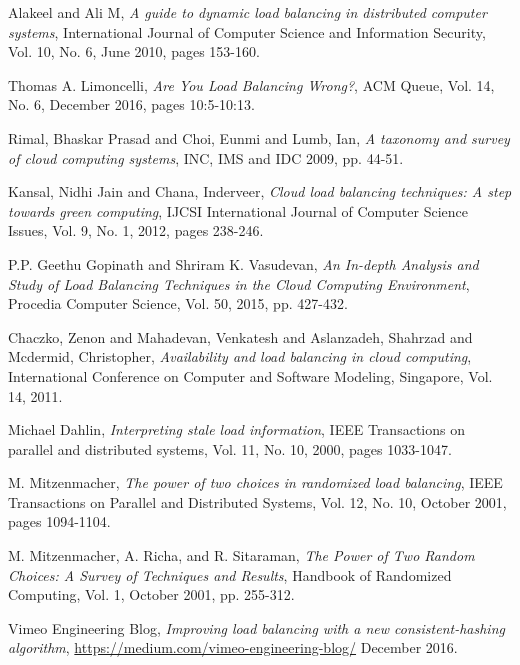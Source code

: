 \begin{thebibliography}{1}

Alakeel and Ali M, \emph{A guide to dynamic load balancing in distributed
  computer systems}, International Journal of Computer Science and Information
  Security, Vol. 10, No. 6, June 2010, pages 153-160.

  Thomas A. Limoncelli, \emph{Are You Load Balancing Wrong?},
  ACM Queue,
  Vol. 14, No. 6, December 2016, pages 10:5-10:13.

  Rimal, Bhaskar Prasad and Choi, Eunmi and Lumb, Ian,
  \emph{A taxonomy and survey of cloud computing systems},
  INC, IMS and IDC
  2009, pp. 44-51.

  Kansal, Nidhi Jain and Chana, Inderveer,
  \emph{Cloud load balancing techniques: A step towards green computing},
  IJCSI International Journal of Computer Science Issues,
  Vol. 9, No. 1, 2012, pages 238-246.

  P.P. Geethu Gopinath and Shriram K. Vasudevan, \emph{An In-depth Analysis and Study of Load Balancing Techniques in the Cloud Computing Environment},
  Procedia Computer Science,
  Vol. 50, 2015, pp. 427-432.

  Chaczko, Zenon and Mahadevan, Venkatesh and Aslanzadeh, Shahrzad and Mcdermid,
  Christopher,
  \emph{Availability and load balancing in cloud computing},
  International Conference on Computer and Software Modeling, Singapore,
  Vol. 14, 2011.

Michael Dahlin, \emph{Interpreting stale load information},
  IEEE Transactions on parallel and distributed systems,
  Vol. 11, No. 10, 2000, pages 1033-1047.

M. Mitzenmacher, \emph{The power of two choices in randomized load balancing},
  IEEE Transactions on Parallel and Distributed Systems,
  Vol. 12, No. 10, October 2001, pages 1094-1104.

M. Mitzenmacher, A. Richa, and R. Sitaraman,
  \emph{The Power of Two Random Choices: A Survey of Techniques and Results},
  Handbook of Randomized Computing,
  Vol. 1, October 2001, pp. 255-312.

  Vimeo Engineering Blog,
  \emph{Improving load balancing with a new consistent-hashing algorithm},
  \url{https://medium.com/vimeo-engineering-blog/} %
  December 2016.


\end{thebibliography}
